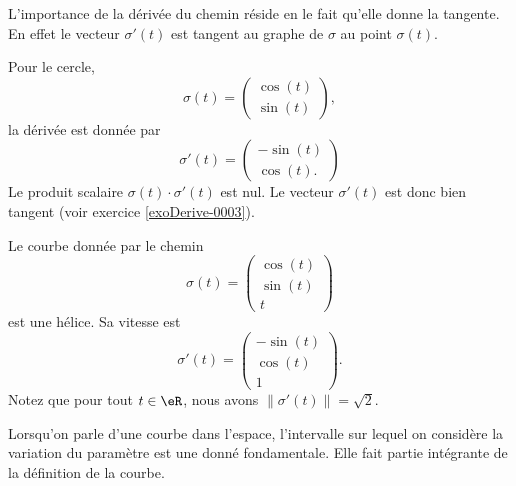 L'importance de la dérivée du chemin réside en le fait qu'elle donne la tangente. En effet le vecteur $\sigma'(t)$ est tangent au graphe de $\sigma$ au point $\sigma(t)$.

\begin{example}
    Pour le cercle,
    \begin{equation}
        \sigma(t)=\begin{pmatrix}
            \cos(t)    \\ 
            \sin(t)    
        \end{pmatrix},
    \end{equation}
    la dérivée est donnée par
    \begin{equation}
        \sigma'(t)=\begin{pmatrix}
            -\sin(t)    \\ 
            \cos(t).    
        \end{pmatrix}
    \end{equation}
    Le produit scalaire $\sigma(t)\cdot \sigma'(t)$ est nul. Le vecteur $\sigma'(t)$ est donc bien tangent (voir exercice \ref{exoDerive-0003}).
\end{example}

\begin{example}
    Le courbe donnée par le chemin
    \begin{equation}
        \sigma(t)=\begin{pmatrix}
            \cos(t)    \\ 
            \sin(t)    \\ 
            t    
        \end{pmatrix}
    \end{equation}
    est une hélice. Sa vitesse est
    \begin{equation}
        \sigma'(t)=\begin{pmatrix}
            -\sin(t)    \\ 
            \cos(t)    \\ 
            1    
        \end{pmatrix}.
    \end{equation}
    Notez que pour tout $t\in\eR$, nous avons $\| \sigma'(t) \|=\sqrt{2}$.
\end{example}

\begin{remark}
    Lorsqu'on parle d'une courbe dans l'espace, l'intervalle sur lequel on considère la variation du paramètre est une donné fondamentale. Elle fait partie intégrante de la définition de la courbe.
\end{remark}

